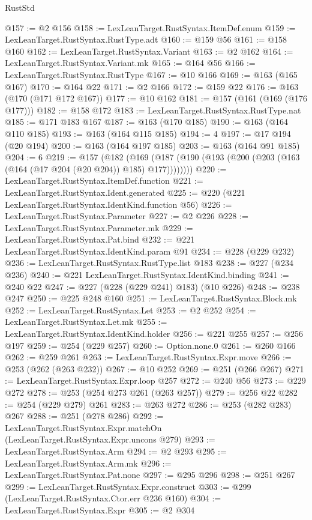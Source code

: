 \begin{lexlean}{RustStd}
\begin{coremodule}
@157 := @2 @156
@158 := LexLeanTarget.RustSyntax.ItemDef.enum
@159 := LexLeanTarget.RustSyntax.RustType.adt
@160 := @159 @56
@161 := @158 @160
@162 := LexLeanTarget.RustSyntax.Variant
@163 := @2 @162
@164 := LexLeanTarget.RustSyntax.Variant.mk
@165 := @164 @56
@166 := LexLeanTarget.RustSyntax.RustType
@167 := @10 @166
@169 := @163 (@165 @167)
@170 := @164 @22
@171 := @2 @166
@172 := @159 @22
@176 := @163 (@170 (@171 @172 @167))
@177 := @10 @162
@181 := @157 (@161 (@169 (@176 @177)))
@182 := @158 @172
@183 := LexLeanTarget.RustSyntax.RustType.nat
@185 := @171 @183 @167
@187 := @163 (@170 @185)
@190 := @163 (@164 @110 @185)
@193 := @163 (@164 @115 @185)
@194 := 4
@197 := @17 @194 (@20 @194)
@200 := @163 (@164 @197 @185)
@203 := @163 (@164 @91 @185)
@204 := 6
@219 := @157
    (@182 (@169 (@187 (@190 (@193 (@200 (@203 (@163 (@164 (@17 @204 (@20 @204)) @185) @177))))))))
@220 := LexLeanTarget.RustSyntax.ItemDef.function
@221 := LexLeanTarget.RustSyntax.Ident.generated
@225 := @220 (@221 LexLeanTarget.RustSyntax.IdentKind.function @56)
@226 := LexLeanTarget.RustSyntax.Parameter
@227 := @2 @226
@228 := LexLeanTarget.RustSyntax.Parameter.mk
@229 := LexLeanTarget.RustSyntax.Pat.bind
@232 := @221 LexLeanTarget.RustSyntax.IdentKind.param @91
@234 := @228 (@229 @232)
@236 := LexLeanTarget.RustSyntax.RustType.list @183
@238 := @227 (@234 @236)
@240 := @221 LexLeanTarget.RustSyntax.IdentKind.binding
@241 := @240 @22
@247 := @227 (@228 (@229 @241) @183) (@10 @226)
@248 := @238 @247
@250 := @225 @248 @160
@251 := LexLeanTarget.RustSyntax.Block.mk
@252 := LexLeanTarget.RustSyntax.Let
@253 := @2 @252
@254 := LexLeanTarget.RustSyntax.Let.mk
@255 := LexLeanTarget.RustSyntax.IdentKind.holder
@256 := @221 @255
@257 := @256 @197
@259 := @254 (@229 @257)
@260 := Option.none.{0}
@261 := @260 @166
@262 := @259 @261
@263 := LexLeanTarget.RustSyntax.Expr.move
@266 := @253 (@262 (@263 @232))
@267 := @10 @252
@269 := @251 (@266 @267)
@271 := LexLeanTarget.RustSyntax.Expr.loop @257
@272 := @240 @56
@273 := @229 @272
@278 := @253 (@254 @273 @261 (@263 @257))
@279 := @256 @22
@282 := @254 (@229 @279) @261
@283 := @263 @272
@286 := @253 (@282 @283) @267
@288 := @251 (@278 @286)
@292 := LexLeanTarget.RustSyntax.Expr.matchOn (LexLeanTarget.RustSyntax.Expr.uncons @279)
@293 := LexLeanTarget.RustSyntax.Arm
@294 := @2 @293
@295 := LexLeanTarget.RustSyntax.Arm.mk
@296 := LexLeanTarget.RustSyntax.Pat.none
@297 := @295 @296
@298 := @251 @267
@299 := LexLeanTarget.RustSyntax.Expr.construct
@303 := @299 (LexLeanTarget.RustSyntax.Ctor.err @236 @160)
@304 := LexLeanTarget.RustSyntax.Expr
@305 := @2 @304

\end{coremodule}
\end{lexlean}

